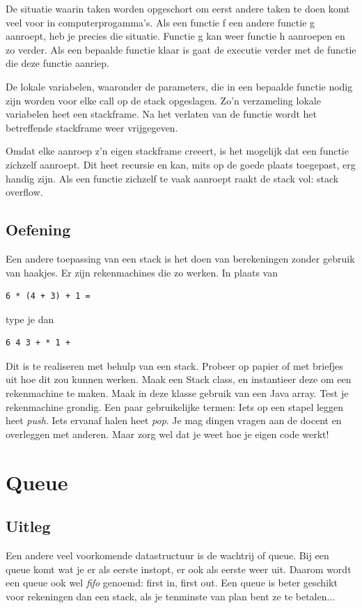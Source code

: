 \documentclass[a4paper,11pt]{article}
\begin{document}
De situatie waarin taken worden opgeschort om eerst andere taken te doen komt veel voor in computerprogamma's.
Als een functie f een andere functie g aanroept, heb je precies die situatie.
Functie g kan weer functie h aanroepen en zo verder.
Als een bepaalde functie klaar is gaat de executie verder met de functie die deze functie aanriep.

De lokale variabelen, waaronder de parameters, die in een bepaalde functie nodig zijn worden voor elke call op de stack opgeslagen.
Zo'n verzameling lokale variabelen heet een stackframe.
Na het verlaten van de functie wordt het betreffende stackframe weer vrijgegeven.

Omdat elke aanroep z'n eigen stackframe creeert, is het mogelijk dat een functie zichzelf aanroept.
Dit heet recursie en kan, mits op de goede plaats toegepast, erg handig zijn.
Als een functie zichzelf te vaak aanroept raakt de stack vol: stack overflow.

\subsection{Oefening}

Een andere toepassing van een stack is het doen van berekeningen zonder gebruik van haakjes.
Er zijn rekenmachines die zo werken.
In plaats van
\begin{verbatim}
6 * (4 + 3) + 1 =
\end{verbatim}
type je dan
\begin{verbatim}
6 4 3 + * 1 +
\end{verbatim}
Dit is te realiseren met behulp van een stack.
Probeer op papier of met briefjes uit hoe dit zou kunnen werken.
Maak een Stack class, en instantieer deze om een rekenmachine te maken.
Maak in deze klasse gebruik van een Java array.
Test je rekenmachine grondig.
Een paar gebruikelijke termen: Iets op een stapel leggen heet \emph{push}.
Iets ervanaf halen heet \emph{pop}.
Je mag dingen vragen aan de docent en overleggen met anderen.
Maar zorg wel dat je weet hoe je eigen code werkt!

\section{Queue}

\subsection{Uitleg}

Een andere veel voorkomende datastructuur is de wachtrij of queue.
Bij een queue komt wat je er als eerste instopt, er ook als eerste weer uit.
Daarom wordt een queue ook wel \emph{fifo} genoemd: first in, first out.
Een queue is beter geschikt voor rekeningen dan een stack, als je tenminste van plan bent ze te betalen...
\end{document}
